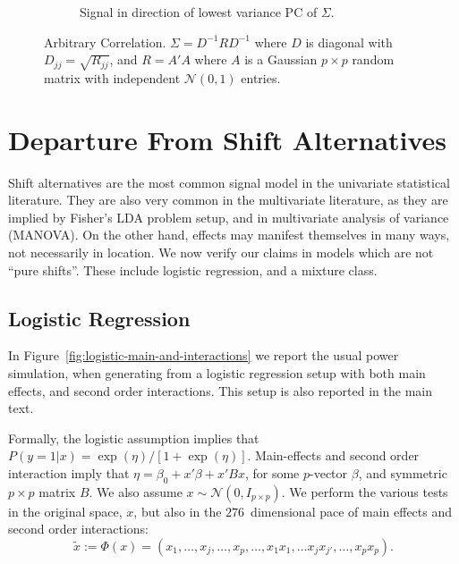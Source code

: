 \documentclass[]{bio}
\begin{document}
\begin{figure}[h]
\begin{subfigure}[t]{.45\columnwidth}
		\caption{Signal in direction of lowest variance PC of $\Sigma$.} 
		\label{fig:dependence_32}
	\end{subfigure}
	\caption{Arbitrary Correlation. 
		$\Sigma=D^{-1} R D^{-1}$ where $D$ is diagonal with $D_{jj}=\sqrt{R_{jj}}$, and $R=A'A$ where $A$ is a Gaussian $p\times p$ random matrix with independent $\mathcal{N}(0,1)$ entries.
	}
	\label{fig:dependence_3}
\end{figure}






\section{Departure From Shift Alternatives}

Shift alternatives are the most common signal model in the univariate statistical literature. 
They are also very common in the multivariate literature, as they are implied by Fisher's LDA problem setup, and in multivariate analysis of variance (MANOVA).
On the other hand, effects may manifest themselves in many ways, not necessarily in location. 
We now verify our claims in models which are not ``pure shifts''. 
These include logistic regression, and a mixture class. 


\subsection{Logistic Regression}

In Figure~\ref{fig:logistic-main-and-interactions} we report the usual power simulation, when generating from a logistic regression setup with both main effects, and second order interactions.
This setup is also reported in the main text.

Formally, the logistic assumption implies that 
$P(y=1|x)=\exp(\eta)/[1+\exp(\eta)]$.
Main-effects and second order interaction imply that 
$\eta=\beta_0+x'\beta +x'Bx$, for some $p$-vector $\beta$, and symmetric $p \times p$ matrix $B$.
We also assume $x \sim \mathcal{N}(0,I_{p\times p})$.
We perform the various tests in the original space, $x$, but also in the $276$~dimensional pace of main effects and second order interactions: 
$$\tilde{x}:=\Phi(x)=(x_1,\dots,x_j,\dots,x_p,\dots,x_1x_1,\dots x_jx_{j'},\dots,x_p x_p).$$
\end{document}
